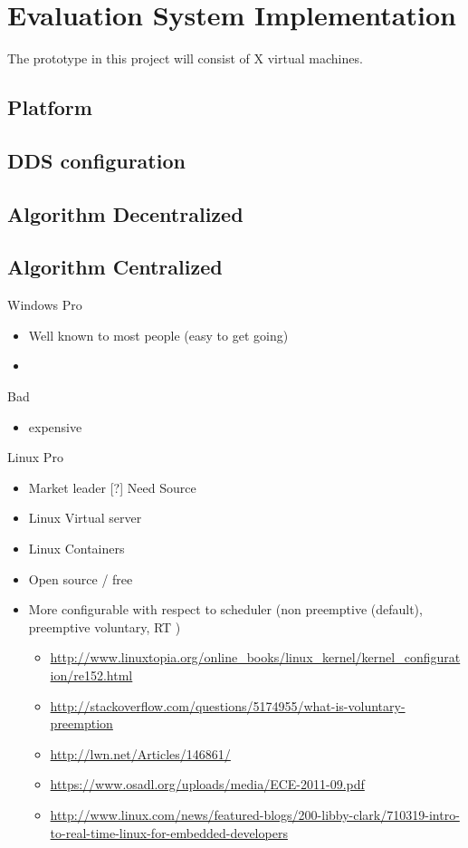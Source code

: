 \chapter{Evaluation System Implementation}
The prototype in this project will consist of X virtual machines.

\section{Platform}

\section{DDS configuration}

\section{Algorithm Decentralized}

\section{Algorithm Centralized}

Windows
Pro
\begin{itemize}
	\item Well known to most people (easy to get going) 
	\item 
\end{itemize}

Bad
\begin{itemize}
	\item expensive
\end{itemize}

Linux
Pro
\begin{itemize}
	\item Market leader [?] Need Source
	\item Linux Virtual server
	\item Linux Containers
	\item Open source / free
	\item More configurable with respect to scheduler (non preemptive (default), preemptive voluntary, RT ) 
	\begin{itemize}
		\item \url{http://www.linuxtopia.org/online_books/linux_kernel/kernel_configuration/re152.html}
		\item \url{http://stackoverflow.com/questions/5174955/what-is-voluntary-preemption}
		\item \url{http://lwn.net/Articles/146861/}
		\item \url{https://www.osadl.org/uploads/media/ECE-2011-09.pdf}
		\item \url{http://www.linux.com/news/featured-blogs/200-libby-clark/710319-intro-to-real-time-linux-for-embedded-developers}
								
	\end{itemize}
\end{itemize}



